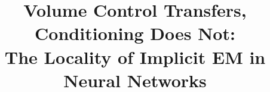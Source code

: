 \documentclass[11pt]{article}
\title{Volume Control Transfers, Conditioning Does Not:\\
The Locality of Implicit EM in Neural Networks}
\author{}
\date{}
\begin{document}
\maketitle

\begin{abstract}

\end{abstract}













\appendix




\end{document}

